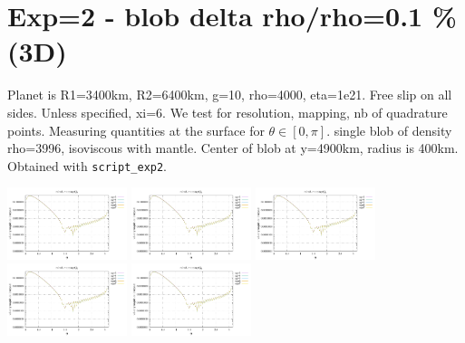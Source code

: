\newpage
\section*{Exp=2 - blob delta rho/rho=0.1 \% (3D)}

Planet is R1=3400km, R2=6400km, g=10, rho=4000, eta=1e21.
Free slip on all sides. Unless specified, xi=6.
We test for resolution, mapping, nb of quadrature points.
Measuring quantities at the surface for $\theta\in[0,\pi]$.
single blob of density rho=3996, isoviscous with mantle.
Center of blob at y=4900km, radius is 400km.
Obtained with {\tt script\_exp2}.

\noindent
\includegraphics[width=3.5cm]{python_codes/fieldstone_152/RESULTS/exp2/vel_16_m2}
\includegraphics[width=3.5cm]{python_codes/fieldstone_152/RESULTS/exp2/vel_16_m3}
\includegraphics[width=3.5cm]{python_codes/fieldstone_152/RESULTS/exp2/vel_16_m4}
\includegraphics[width=3.5cm]{python_codes/fieldstone_152/RESULTS/exp2/vel_16_m5}
\includegraphics[width=3.5cm]{python_codes/fieldstone_152/RESULTS/exp2/vel_16_m6}

